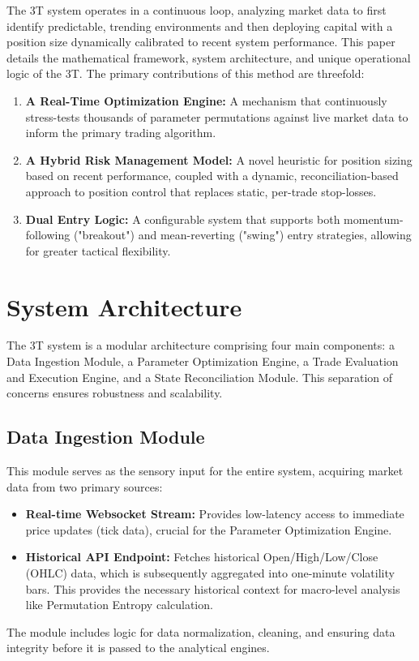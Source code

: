 \documentclass[11pt]{article}
\begin{document}
The 3T system operates in a continuous loop, analyzing market data to first identify predictable, trending environments and then deploying capital with a position size dynamically calibrated to recent system performance. This paper details the mathematical framework, system architecture, and unique operational logic of the 3T. The primary contributions of this method are threefold:
\begin{enumerate}
    \item \textbf{A Real-Time Optimization Engine:} A mechanism that continuously stress-tests thousands of parameter permutations against live market data to inform the primary trading algorithm.
    \item \textbf{A Hybrid Risk Management Model:} A novel heuristic for position sizing based on recent performance, coupled with a dynamic, reconciliation-based approach to position control that replaces static, per-trade stop-losses.
    \item \textbf{Dual Entry Logic:} A configurable system that supports both momentum-following ("breakout") and mean-reverting ("swing") entry strategies, allowing for greater tactical flexibility.
\end{enumerate}

\section{System Architecture}
The 3T system is a modular architecture comprising four main components: a Data Ingestion Module, a Parameter Optimization Engine, a Trade Evaluation and Execution Engine, and a State Reconciliation Module. This separation of concerns ensures robustness and scalability.

\subsection{Data Ingestion Module}
This module serves as the sensory input for the entire system, acquiring market data from two primary sources:
\begin{itemize}
    \item \textbf{Real-time Websocket Stream:} Provides low-latency access to immediate price updates (tick data), crucial for the Parameter Optimization Engine.
    \item \textbf{Historical API Endpoint:} Fetches historical Open/High/Low/Close (OHLC) data, which is subsequently aggregated into one-minute volatility bars. This provides the necessary historical context for macro-level analysis like Permutation Entropy calculation.
\end{itemize}
The module includes logic for data normalization, cleaning, and ensuring data integrity before it is passed to the analytical engines.
\end{document}

